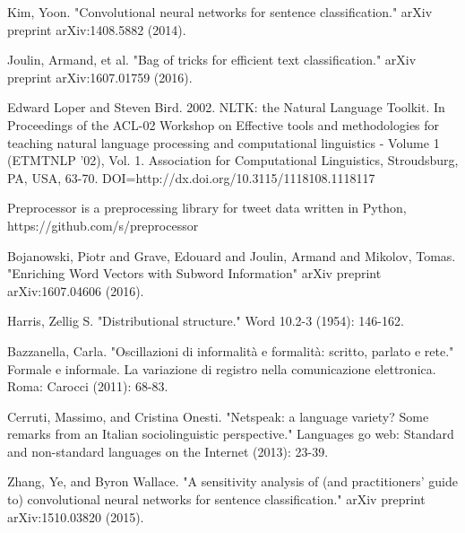 \begin{thebibliography}{1}

Kim, Yoon. "Convolutional neural networks for sentence classification." arXiv preprint arXiv:1408.5882 (2014).

Joulin, Armand, et al. "Bag of tricks for efficient text classification." arXiv preprint arXiv:1607.01759 (2016).

Edward Loper and Steven Bird. 2002. NLTK: the Natural Language Toolkit. In Proceedings of the ACL-02 Workshop on Effective tools and methodologies for teaching natural language processing and computational linguistics - Volume 1 (ETMTNLP '02), Vol. 1. Association for Computational Linguistics, Stroudsburg, PA, USA, 63-70. DOI=http://dx.doi.org/10.3115/1118108.1118117

Preprocessor is a preprocessing library for tweet data written in Python, https://github.com/s/preprocessor

Bojanowski, Piotr and Grave, Edouard and Joulin, Armand and Mikolov, Tomas. "Enriching Word Vectors with Subword Information" arXiv preprint arXiv:1607.04606 (2016).

Harris, Zellig S. "Distributional structure." Word 10.2-3 (1954): 146-162.

Bazzanella, Carla. "Oscillazioni di informalità e formalità: scritto, parlato e rete." Formale e informale. La variazione di registro nella comunicazione elettronica. Roma: Carocci (2011): 68-83.

Cerruti, Massimo, and Cristina Onesti. "Netspeak: a language variety? Some remarks from an Italian sociolinguistic perspective." Languages go web: Standard and non-standard languages on the Internet (2013): 23-39.

Zhang, Ye, and Byron Wallace. "A sensitivity analysis of (and practitioners' guide to) convolutional neural networks for sentence classification." arXiv preprint arXiv:1510.03820 (2015).

\end{thebibliography}